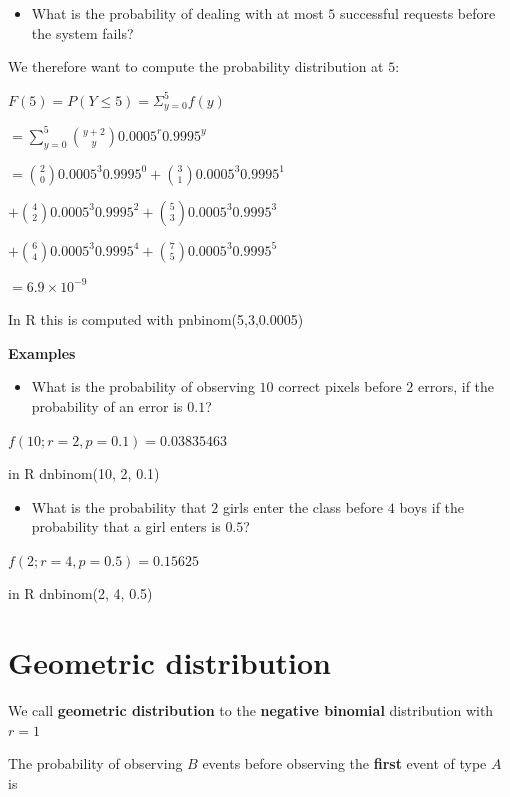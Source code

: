 \documentclass[
]{book}
\providecommand{\tightlist}{%
  \setlength{\itemsep}{0pt}\setlength{\parskip}{0pt}}
\begin{document}
\begin{itemize}
\tightlist
\item
  What is the probability of dealing with at most \(5\) successful requests before the system fails?
\end{itemize}

We therefore want to compute the probability distribution at \(5\):

\(F(5)=P(Y\leq 5)=\Sigma_{y=0}^5 f(y)\)

\(=\sum_{y=0}^5\binom {y+2} y 0.0005^r0.9995^y\)

\(=\binom {2} 0 0.0005^3 0.9995^0 +\binom {3} 1 0.0005^3 0.9995^1\)

\(+\binom {4} 2 0.0005^3 0.9995^2 +\binom {5} 3 0.0005^3 0.9995^3\)

\(+\binom {6} 4 0.0005^3 0.9995^4 +\binom {7} 5 0.0005^3 0.9995^5\)

\(= 6.9\times 10^{-9}\)

In R this is computed with pnbinom(5,3,0.0005)

\textbf{Examples}

\begin{itemize}
\tightlist
\item
  What is the probability of observing \(10\) correct pixels before \(2\) errors, if the probability of an error is \(0.1\)?
\end{itemize}

\(f(10; r=2, p=0.1)=0.03835463\)

in R dnbinom(10, 2, 0.1)

\begin{itemize}
\tightlist
\item
  What is the probability that \(2\) girls enter the class before \(4\) boys if the probability that a girl enters is \(0.5\)?
\end{itemize}

\(f(2; r=4, p=0.5)=0.15625\)

in R dnbinom(2, 4, 0.5)

\hypertarget{geometric-distribution}{%
\section{Geometric distribution}\label{geometric-distribution}}

We call \textbf{geometric distribution} to the \textbf{negative binomial} distribution with \(r=1\)

The probability of observing \(B\) events before observing the \textbf{first} event of type \(A\) is
\end{document}
